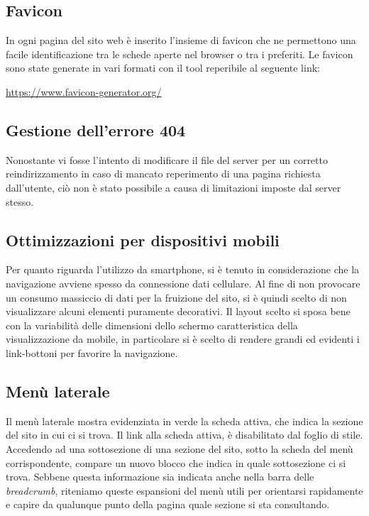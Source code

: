 \documentclass[12pt]{article}
\begin{document}
	\subsection{Favicon}
	In ogni pagina del sito web è inserito l'insieme di favicon che ne permettono una facile identificazione tra le schede aperte nel browser o tra i preferiti. Le favicon sono state generate in vari formati con il tool reperibile al seguente link:

	\begin{center}
		\url{https://www.favicon-generator.org/}
	\end{center}

	\subsection{Gestione dell'errore 404}
	Nonostante vi fosse l'intento di modificare il file  del server per un corretto reindirizzamento in caso di mancato reperimento di una pagina richiesta dall'utente, ciò non è stato possibile a causa di limitazioni imposte dal server stesso.

	\subsection{Ottimizzazioni per dispositivi mobili}
	Per quanto riguarda l'utilizzo da smartphone, si è tenuto in considerazione che la navigazione avviene spesso da connessione dati cellulare. Al fine di non provocare un consumo massiccio di dati per la fruizione del sito, si è quindi scelto di non visualizzare alcuni elementi puramente decorativi. Il layout scelto si sposa bene con la variabilità delle dimensioni dello schermo caratteristica della visualizzazione da mobile, in particolare si è scelto di rendere grandi ed evidenti i link-bottoni per favorire la navigazione. 
	
	\subsection{Menù laterale} \label{ssec:menuusab}
	Il menù laterale mostra evidenziata in verde la scheda attiva, che indica la sezione del sito in cui ci si trova. Il link alla scheda attiva, è disabilitato dal foglio di stile. Accedendo ad una sottosezione di una sezione del sito, sotto la scheda del menù corrispondente, compare un nuovo blocco che indica in quale sottosezione ci si trova. Sebbene questa informazione sia indicata anche nella barra delle \textit{breadcrumb}, riteniamo queste espansioni del menù utili per orientarsi rapidamente e capire da qualunque punto della pagina quale sezione si sta consultando.
	
\end{document}
